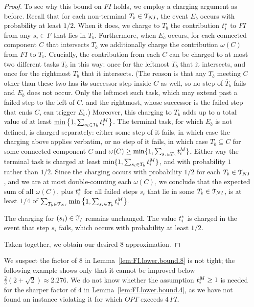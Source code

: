 \begin{proof}
    To see why this bound on $FI$ holds, we employ a charging argument as before.
    Recall that for each non-terminal $T_b \in \mathcal{T}_{NI}$, the event $E_b$ occurs with probability at least $1/2$.
    When it does, we charge to $T_b$ the contribution $t^*_{i}$ to $FI$ from any $s_i \in F$ that lies in $T_b$.
    Furthermore, when $E_b$ occurs, for each connected component $C$ that intersects $T_b$ we additionally charge the contribution $\omega(C)$ from $FI$ to $T_b$.
    Crucially, the contribution from each $C$ can be charged to at most two different tasks $T_b$ in this way: once for the leftmost $T_b$ that it intersects, and once for the rightmost $T_b$ that it intersects.
    (The reason is that any $T_b$ meeting $C$ other than these two has its successor step inside $C$ as well, so no step of $\overline{T}_b$ fails and $E_b$ does not occur.
    Only the leftmost such task, which may extend past a failed step to the left of $C$, and the rightmost, whose successor is the failed step that ends $C$, can trigger $E_b$.)
    Moreover, this charging to $T_b$ adds up to a  total value of at least $\min\left\{1, \sum_{s_i \in T_b} t^{M}_{i} \right\}$.
    The terminal task, for which $E_b$ is not defined, is charged separately: either some step of it fails, in which case the charging above applies verbatim, or no step of it fails, in which case $T_b \subseteq C$ for some connected component $C$ and $\omega(C) \geq \min\{1, \sum_{s_i \in T_b} t^{M}_{i}\}$.
    Either way the terminal task is charged at least $\min\{1, \sum_{s_i \in T_b} t^{M}_{i}\}$, and with probability $1$ rather than $1/2$.
    Since the charging occurs with probability $1/2$ for each $T_b \in \mathcal{T}_{NI}$, and we are at most double-counting each $\omega(C)$, we conclude that the expected sum of all $\omega(C)$, plus $t^*_{i}$ for all failed steps $s_i$ that lie in some $T_b \in \mathcal{T}_{NI}$, is at least $1/4$ of $\sum_{T_b \in \mathcal{T}_{NI}}\min\left\{1, \sum_{s_i \in T_b} t^{M}_{i} \right\}$.

    The charging for $(s_i) \in \mathcal{T}_I$ remains unchanged.
    The value $t^*_{i}$ is charged in the event that step $s_i$ fails, which occurs with probability at least $1/2$.

    Taken together, we obtain our desired $8$ approximation.
\end{proof}

We suspect the factor of $8$ in Lemma~\ref{lem:FI.lower.bound.8} is not tight; the following example shows only that it cannot be improved below $\tfrac{2}{3}(2+\sqrt{2}) \approx 2.276$.
We do not know whether the assumption $t^{M}_{i} \geq 1$ is needed for the sharper factor of $4$ in Lemma~\ref{lem:FI.lower.bound.4}, as we have not found an instance violating it for which $OPT$ exceeds $4\,FI$.

